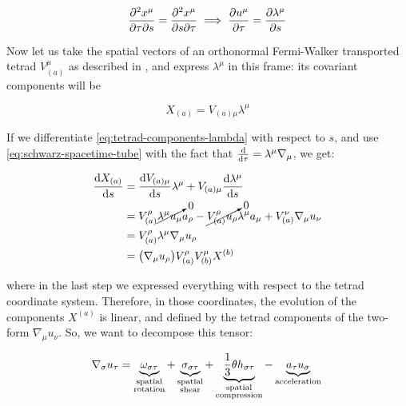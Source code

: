 \documentclass[main.tex]{subfiles}
\begin{document}
\begin{equation} \label{eq:schwarz-spacetime-tube}
    \pdv{x^\mu}{\tau}{s} =
    \pdv{x^\mu}{s}{\tau}
    \implies
    \pdv{u^\mu}{\tau} = \pdv{\lambda^\mu}{s}
\end{equation}

Now let us take the spatial vectors of an orthonormal Fermi-Walker transported tetrad \(V^\mu_{(a)}\) as described in , and express \(\lambda^\mu\) in this frame: its covariant components will be

\begin{equation} \label{eq:tetrad-components-lambda}
    X_{(a)} = V_{(a)\mu} \lambda^\mu
\end{equation}

If we differentiate \eqref{eq:tetrad-components-lambda} with respect to \(s\), and use \eqref{eq:schwarz-spacetime-tube} with the fact that \(\dv{}{\tau} = \lambda^\mu \nabla_\mu \), we get:

\begin{subequations}
\begin{align}
    \dv{X_{(a)}}{s} &= \dv{V_{(a)\mu}}{s} \lambda^\mu + V_{(a)\mu} \dv{\lambda^\mu}{s}  \\
    &= V_{(a)}^\rho \cancelto{0}{\lambda^\mu u_\mu} a_\rho - \cancelto{0}{V_{(a)}^\rho  u_\rho} \lambda^\mu a_\mu
    + V_{(a)}^\nu \nabla_\mu u_\nu  \\
    &= V^\rho _{(a)} \lambda^\mu \nabla_\mu u_\rho  \\
    &= \qty(\nabla_\mu u_\rho) V^\rho_{(a)} V^{\mu}_{(b)} X^{(b)}
\end{align}
\end{subequations}

where in the last step we expressed everything with respect to the tetrad coordinate system. Therefore, in those coordinates, the evolution of the components \(X^{(a)}\) is linear, and defined by the tetrad components of the two-form \(\nabla_\mu u_\nu\). So, we want to decompose this tensor:

\begin{equation} \label{eq:covariant-acceleration-decomposition}
    \nabla_\sigma u_\tau =
    \underbrace{\omega_{\sigma \tau}}_{\substack{\text{spatial} \\ \text{rotation}}}
    + \underbrace{\sigma_{\sigma\tau}}_{\substack{\text{spatial} \\ \text{shear}}}
    + \underbrace{\frac{1}{3} \theta h_{\sigma\tau}}_{\substack{\text{spatial} \\
    \text{compression}}}
    - \underbrace{ a_\tau u_\sigma}_{ \text{acceleration}} \\
\end{equation}
\end{document}
